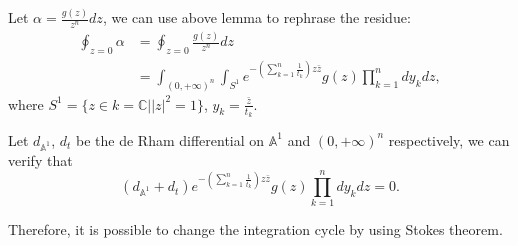 \documentclass[11pt]{amsart}
\theoremstyle{definition}
\theoremstyle{remark}
\numberwithin{equation}{section}
\begin{document}
Let $\alpha=\frac{g(z)}{z^{n}}dz$, we can use above lemma to rephrase the residue:
\begin{align*}
\oint_{z=0}\alpha 
&=
\oint_{z=0}\frac{g(z)}{z^{n}}dz \\
&=
\int_{(0,+\infty)^{n}}\int_{S^{1}}e^{-\left(\sum_{k=1}^{n}\frac{1}{t_{k}}\right)z\bar{z}}g(z)\prod_{k=1}^{n}dy_{k}dz,
\end{align*}
where $S^{1}=\{z\in k=\mathbb{C}||z|^2=1\}$, $y_{k}=\frac{\bar{z}}{t_{k}}$.

Let $d_{\mathbb{A}^{1}}$, $d_{t}$ be the de Rham differential on $\mathbb{A}^{1}$ and $(0,+\infty)^{n}$ respectively, we can verify that 
$$
(d_{\mathbb{A}^{1}}+d_{t})e^{-\left(\sum_{k=1}^{n}\frac{1}{t_{k}}\right)z\bar{z}}g(z)\prod_{k=1}^{n}dy_{k}dz=0.
$$

Therefore, it is possible to change the integration cycle by using Stokes theorem.
\end{document}
